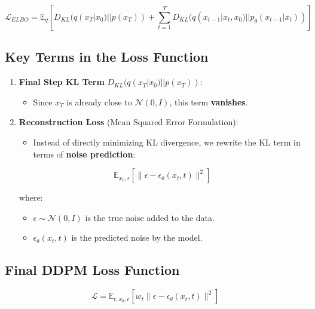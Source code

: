 \documentclass[
]{book}
\providecommand{\tightlist}{%
  \setlength{\itemsep}{0pt}\setlength{\parskip}{0pt}}
\begin{document}
\[
\mathcal{L}_{ELBO} = \mathbb{E}_q \left[ D_{KL} (q(x_T | x_0) || p(x_T)) + \sum_{t=1}^{T} D_{KL} (q(x_{t-1} | x_t, x_0) || p_\theta(x_{t-1} | x_t)) \right]
\]

\subsection{\texorpdfstring{\textbf{Key Terms in the Loss Function}}{Key Terms in the Loss Function}}\label{key-terms-in-the-loss-function}

\begin{enumerate}
\def\labelenumi{\arabic{enumi}.}
\item
  \textbf{Final Step KL Term} \(D_{KL} (q(x_T | x_0) || p(x_T))\):

  \begin{itemize}
  \tightlist
  \item
    Since \(x_T\) is already close to \(\mathcal{N}(0, I)\), this term \textbf{vanishes}.
  \end{itemize}
\item
  \textbf{Reconstruction Loss} (Mean Squared Error Formulation):

  \begin{itemize}
  \tightlist
  \item
    Instead of directly minimizing KL divergence, we rewrite the KL term in terms of \textbf{noise prediction}:
  \end{itemize}

  \[
  \mathbb{E}_{x_0, \epsilon} \left[ \|\epsilon - \epsilon_\theta(x_t, t)\|^2 \right]
  \]

  where:

  \begin{itemize}
  \tightlist
  \item
    \(\epsilon \sim \mathcal{N}(0, I)\) is the true noise added to the data.
  \item
    \(\epsilon_\theta(x_t, t)\) is the predicted noise by the model.
  \end{itemize}
\end{enumerate}

\subsection{\texorpdfstring{\textbf{Final DDPM Loss Function}}{Final DDPM Loss Function}}\label{final-ddpm-loss-function}

\[
\mathcal{L} = \mathbb{E}_{t, x_0, \epsilon} \left[ w_t \|\epsilon - \epsilon_\theta(x_t, t)\|^2 \right]
\]
\end{document}
